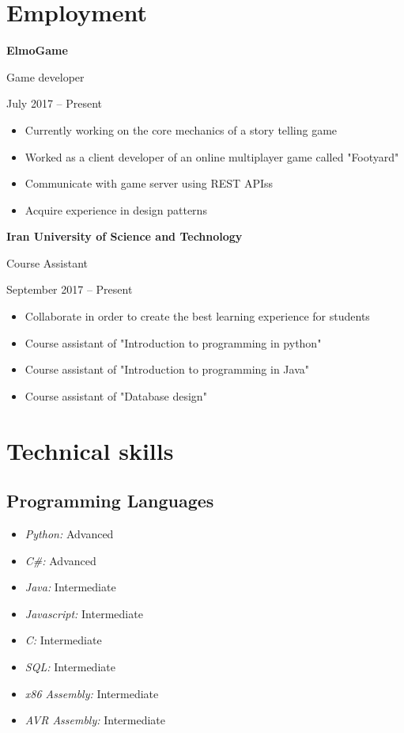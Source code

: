 \documentclass{article}
\begin{document}
\section {Employment}
\noindent \textbf{ElmoGame} \par
Game developer \par
July 2017 – Present \par
\begin{itemize}
        \item Currently working on the core mechanics of a story telling game
        \item Worked as a client developer of an online multiplayer game called "Footyard"
        \item Communicate with game server using REST APIss
        \item Acquire experience in design patterns
\end{itemize}

\pagebreak

\noindent \textbf{Iran University of Science and Technology} \par
Course Assistant \par
September 2017 – Present \par
\begin{itemize}
        \item Collaborate in order to create the best learning experience for students
        \item Course assistant of "Introduction to programming in python"
        \item Course assistant of "Introduction to programming in Java"
        \item Course assistant of "Database design"
\end{itemize}

\section{Technical skills}
\subsection{Programming Languages}
\begin{multicols}{2}
\begin{itemize}
        \item \emph{Python:} Advanced
        \item \emph{C\#:} Advanced
        \item \emph{Java:} Intermediate
        \item \emph{Javascript:} Intermediate
        \item \emph{C:} Intermediate
        \item \emph{SQL:} Intermediate
        \item \emph{x86 Assembly:} Intermediate
        \item \emph{AVR Assembly:} Intermediate
\end{itemize}
\end{multicols}
\end{document}
